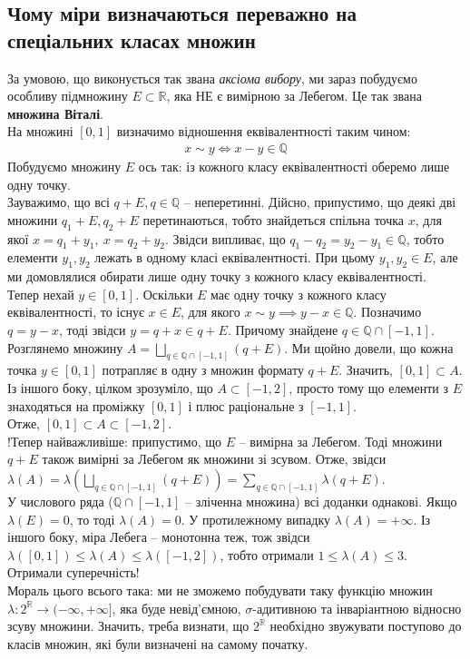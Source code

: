 \documentclass[a4paper, 10pt]{article}
\theoremstyle{theoremdd}
\begin{document}
\subsection*{Чому міри визначаються переважно на спеціальних класах множин}
За умовою, що виконується так звана \textit{аксіома вибору}, ми зараз побудуємо особливу підмножину $E \subset \mathbb{R}$, яка НЕ є вимірною за Лебегом. Це так звана \textbf{множина Віталі}.
\bigskip \\
На множині $[0,1]$ визначимо відношення еквівалентності таким чином:
\begin{align*}
x \sim y \iff x - y \in \mathbb{Q}
\end{align*}
Побудуємо множину $E$ ось так: із кожного класу еквівалентності оберемо лише одну точку.\\
Зауважимо, що всі $q + E, q \in \mathbb{Q}$ -- неперетинні. Дійсно, припустимо, що деякі дві множини $q_1 + E, q_2 + E$ перетинаються, тобто знайдеться спільна точка $x$, для якої $x = q_1 + y_1,\ x = q_2 + y_2$. Звідси випливає, що $q_1 - q_2 = y_2 - y_1 \in \mathbb{Q}$, тобто елементи $y_1,y_2$ лежать в одному класі еквівалентності. При цьому $y_1,y_2 \in E$, але ми домовлялися обирати лише одну точку з кожного класу еквівалентності.\\
Тепер нехай $y \in [0,1]$. Оскільки $E$ має одну точку з кожного класу еквівалентності, то існує $x \in E$, для якого $x \sim y \implies y - x \in \mathbb{Q}$. Позначимо $q = y - x$, тоді звідси $y = q + x \in q + E$. Причому знайдене $q \in \mathbb{Q} \cap [-1,1]$.\\
Розглянемо множину $A = \displaystyle\bigsqcup_{q \in \mathbb{Q} \cap [-1,1]} (q+E)$. Ми щойно довели, що кожна точка $y \in [0,1]$ потрапляє в одну з множин формату $q+E$. Значить, $[0,1] \subset A$. Із іншого боку, цілком зрозуміло, що $A \subset [-1,2]$, просто тому що елементи з $E$ знаходяться на проміжку $[0,1]$ і плюс раціональне з $[-1,1]$.\\
Отже, $[0,1] \subset A \subset [-1,2]$.
\bigskip \\
!Тепер найважливіше: припустимо, що $E$ -- вимірна за Лебегом. Тоді множини $q+E$ також вимірні за Лебегом як множини зі зсувом. Отже, звідси\\
$\displaystyle\lambda(A) = \lambda\left( \bigsqcup_{q \in \mathbb{Q} \cap [-1,1]} (q+E) \right) = \sum_{q \in \mathbb{Q} \cap [-1,1]} \lambda(q + E)$.\\
У числового ряда ($\mathbb{Q} \cap [-1,1]$ -- зліченна множина) всі доданки однакові. Якщо $\lambda(E) = 0$, то тоді $\lambda(A) = 0$. У протилежному випадку $\lambda(A) = +\infty$. Із іншого боку, міра Лебега -- монотонна теж, тож звідси $\lambda([0,1]) \leq \lambda(A) \leq \lambda([-1,2])$, тобто отримали $1 \leq \lambda(A) \leq 3$. Отримали суперечність!
\bigskip \\
Мораль цього всього така: ми не зможемо побудувати таку функцію множин $\lambda \colon 2^{\mathbb{R}} \to (-\infty,+\infty]$, яка буде невід'ємною, $\sigma$-адитивною та інваріантною відносно зсуву множини. Значить, треба визнати, що $2^{\mathbb{R}}$ необхідно звужувати поступово до класів множин, які були визначені на самому початку.
\newpage
\end{document}
